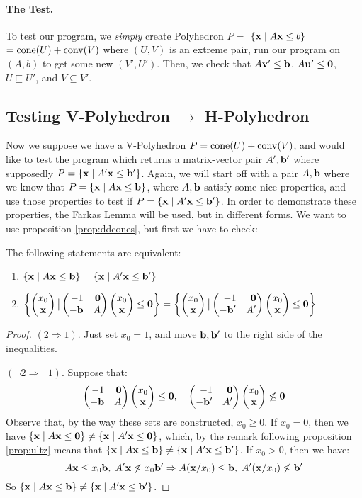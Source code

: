 \paragraph{The Test.}  To test our program, we \textit{simply} create Polyhedron $P =$ $\left\{\mathbf{x}\;|\; A\mathbf{x}\leq b\right\}$ $= \operatorname{cone}(U) + \operatorname{conv}(V)$ where $(U,V)$ is an extreme pair, run our program on $(A,b)$ to get some new $(V',U')$.  Then, we check that $A\mathbf{v}' \leq \mathbf{b}$, $A\mathbf{u}'\leq\mathbf{0}$, $U\sqsubseteq U'$, and $V\subseteq V'$.

\subsection{Testing V-Polyhedron $\to$ H-Polyhedron}
Now we suppose we have a V-Polyhedron $P = \operatorname{cone}(U) + \operatorname{conv}(V)$, and would like to test the program which returns a matrix-vector pair $A',\mathbf{b}'$ where supposedly $P = \left\{\mathbf{x}\;|\; A'\mathbf{x}\leq \mathbf{b}'\right\}$.  Again, we will start off with a pair $A,\mathbf{b}$ where we know that $P = \left\{\mathbf{x}\;|\; A\mathbf{x}\leq \mathbf{b}\right\}$, where $A,\mathbf{b}$ satisfy some nice properties, and use those properties to test if $P = \left\{\mathbf{x}\;|\; A'\mathbf{x}\leq \mathbf{b}'\right\}$.  In order to demonstrate these properties, the Farkas Lemma will be used, but in different forms.  We want to use proposition \ref{prop:ddcones}, but first we have to check:

\begin{Prop}{\label{prop:homog}
  The following statements are equivalent:
  \begin{enumerate}
    \item $\left\{\mathbf{x}\;|\; A\mathbf{x}\leq \mathbf{b}\right\} = \left\{\mathbf{x}\;|\; A'\mathbf{x}\leq \mathbf{b}'\right\}$
    \item $\set{\xx \big| \pmb -1 & \0 \\ -\b & A \pme \xx \leq \0} = 
           \set{\xx \big| \pmb -1 & \0 \\ -\b' & A' \pme \xx \leq \0}$
  \end{enumerate}
}\end{Prop}

\begin{proof}
$(2 \Rightarrow 1)$.  Just set $x_0 = 1$, and move $\mathbf{b},\mathbf{b}'$ to the right side of the inequalities.

$(\neg 2 \Rightarrow \neg 1)$.  Suppose that:
\[ \pmb -1 & \0 \\ -\b & A \pme \xx \leq \0,\quad
   \pmb -1 & \0 \\ -\b' & A' \pme \xx \not\leq \0 \]
Observe that, by the way these sets are constructed, $x_0 \geq 0$.  If $x_0 = 0$, then we have $\left\{\mathbf{x}\;|\; A\mathbf{x}\leq\mathbf{0}\right\} \neq \left\{\mathbf{x}\;|\; A'\mathbf{x}\leq\mathbf{0}\right\}$, which, by the remark following proposition \ref{prop:ultz} means that $\left\{\mathbf{x}\;|\; A\mathbf{x}\leq \mathbf{b}\right\} \neq \left\{\mathbf{x}\;|\; A'\mathbf{x}\leq \mathbf{b}'\right\}$.  If $x_0 > 0$, then we have:
  \[ A\mathbf{x} \leq x_0\mathbf{b},\;A'\mathbf{x}\not\leq x_0\mathbf{b}' \Rightarrow A(\mathbf{x}/x_0)\leq\mathbf{b},\;A'(\mathbf{x}/x_0)\not\leq\mathbf{b}' \]
  So $\left\{\mathbf{x}\;|\; A\mathbf{x}\leq \mathbf{b}\right\} \neq \left\{\mathbf{x}\;|\; A'\mathbf{x}\leq \mathbf{b}'\right\}$.
\end{proof}

